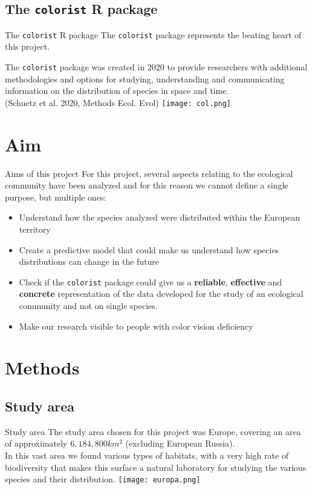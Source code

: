 \documentclass{beamer}
\begin{document}
\subsection{The \texttt{colorist} R package}
\begin{frame}{The \texttt{colorist} R package}
\centering
    The \texttt{colorist} package represents the beating heart of this project.
    \bigskip
    
    The \texttt{colorist} package was created in 2020 to provide researchers with additional methodologies and options for studying, understanding and communicating information on the distribution of species in space and time. \\ 
    \textcolor{unibo}{(Schuetz et al. 2020, Methods Ecol. Evol)}
    \centering
    \texttt{[image: col.png]}
\end{frame}
\section{Aim}
\begin{frame}{Aims of this project}
For this project, several aspects relating to the ecological community have been analyzed and for this reason we cannot define a single purpose, but multiple ones:
\begin{itemize}
    \item Understand how the species analyzed were distributed within the European territory\pause
    \item Create a predictive model that could make us understand how species distributions can change in the future\pause
    \item Check if the \texttt{colorist} package could give us a \textbf{reliable}, \textbf{effective} and \textbf{concrete} representation of the data developed for the study of an ecological community and not on single species.\pause
    \item Make our research visible to people with color vision deficiency
\end{itemize}
    
\end{frame}


\section{Methods}
\subsection{Study area}
\begin{frame}{Study area}
    \centering
    The study area chosen for this project was Europe, covering an area of approximately $6,184,800 km^{2}$ (excluding European Russia).\\
    In this vast area we found various types of habitats, with a very high rate of biodiversity that makes this surface a natural laboratory for studying the various species and their distribution.
    \centering
    \texttt{[image: europa.png]}
\end{frame}
\end{document}
